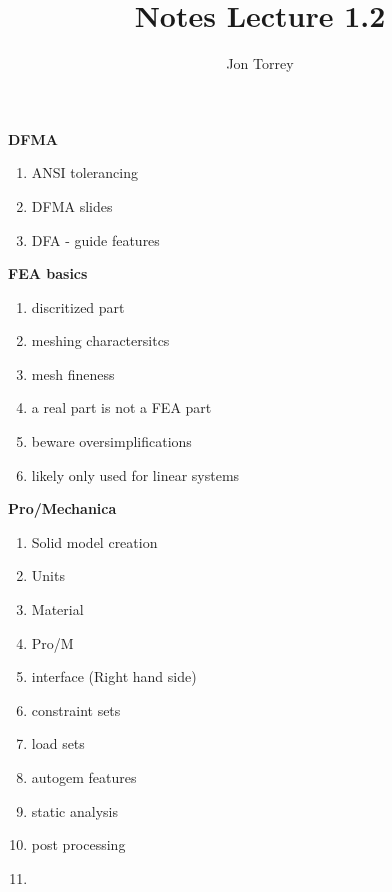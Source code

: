 \documentclass{homework}
\title{Notes Lecture 1.2}
\author{Jon Torrey}
\begin{document}
\textbf{DFMA}

\begin{enumerate}
  \item ANSI tolerancing
  \item DFMA slides
  \item DFA - guide features
\end{enumerate}

\textbf{FEA basics}

\begin{enumerate}
  \item discritized part
  \item meshing charactersitcs
  \item mesh fineness
  \item a real part is not a FEA part
  \item beware oversimplifications
  \item likely only used for linear systems
\end{enumerate}

\textbf{Pro/Mechanica}

\begin{enumerate}
    \item Solid model creation
    \item Units
    \item Material
    \item Pro/M
    \item interface (Right hand side)
    \item constraint sets
    \item load sets
    \item autogem features
    \item static analysis
    \item post processing
    \item 
\end{enumerate}
\end{document}
